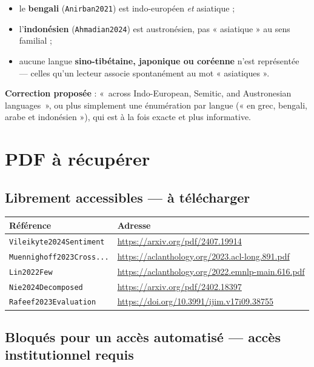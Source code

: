 \documentclass[11pt,a4paper]{article}
\newcommand{\cle}[1]{\texttt{\small #1}}
\begin{document}
\begin{itemize}
\item le \textbf{bengali} (\cle{Anirban2021}) est indo-européen \emph{et}
asiatique ;
\item l'\textbf{indonésien} (\cle{Ahmadian2024}) est austronésien, pas
« asiatique » au sens familial ;
\item aucune langue \textbf{sino-tibétaine, japonique ou coréenne} n'est
représentée --- celles qu'un lecteur associe spontanément au mot « asiatiques ».
\end{itemize}

\noindent\textbf{Correction proposée} : «~across Indo-European, Semitic, and
Austronesian languages~», ou plus simplement une énumération par langue
(« en grec, bengali, arabe et indonésien »), qui est à la fois exacte et plus
informative.

\section{PDF à récupérer}

\subsection*{Librement accessibles --- à télécharger}

\begin{center}
\begin{tabular}{@{}p{4.4cm}p{9.6cm}@{}}
\toprule
\textbf{Référence} & \textbf{Adresse} \\
\midrule
\cle{Vileikyte2024Sentiment} & \url{https://arxiv.org/pdf/2407.19914} \\
\cle{Muennighoff2023Cross...} & \url{https://aclanthology.org/2023.acl-long.891.pdf} \\
\cle{Lin2022Few} & \url{https://aclanthology.org/2022.emnlp-main.616.pdf} \\
\cle{Nie2024Decomposed} & \url{https://arxiv.org/pdf/2402.18397} \\
\cle{Rafeef2023Evaluation} & \url{https://doi.org/10.3991/ijim.v17i09.38755} \\
\bottomrule
\end{tabular}
\end{center}

\subsection*{Bloqués pour un accès automatisé --- accès institutionnel requis}
\end{document}
